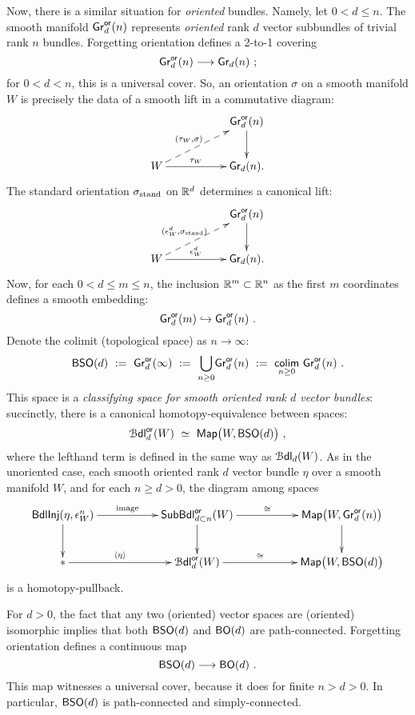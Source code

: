 Now, there is a similar situation for \emph{oriented} bundles.
Namely, let $0<d\leq n$.
The smooth manifold 
$
{\sf Gr}^{\sf or}_d(n)
$
represents \emph{oriented} rank $d$ vector subbundles of trivial rank $n$ bundles. 
Forgetting orientation defines a 2-to-1 covering 
\[
{\sf Gr}^{\sf or}_d(n)
\longrightarrow
{\sf Gr}_d(n)
~;
\]
for $0<d<n$, this is a universal cover.
So, an orientation $\sigma$ on a smooth manifold $W$ is precisely the data of a smooth lift in a commutative diagram:
\[
\xymatrix{
&&
{\sf Gr}^{\sf or}_d(n)
\ar[d]
\\
W
\ar[rr]^-{\tau_W}
\ar@{-->}[urr]^-{(\tau_W , \sigma)}
&&
{\sf Gr}_d(n)
.
}
\]
The standard orientation $\sigma_{\rm stand}$ on $\mathbb R^d$ determines a canonical lift:
\[
\xymatrix{
&&
{\sf Gr}^{\sf or}_d(n)
\ar[d]
\\
W
\ar[rr]^-{\epsilon^d_W}
\ar@{-->}[urr]^-{(\epsilon^d_W , \sigma_{\rm stand})}
&&
{\sf Gr}_d(n)
.
}
\]
Now, for each $0< d\leq m \leq n$, the inclusion $\mathbb R^m \subset \mathbb R^n$ as the first $m$ coordinates defines a smooth embedding:
\[
{\sf Gr}^{\sf or}_d(m)
\hookrightarrow
{\sf Gr}^{\sf or}_d(n)
~.
\]
Denote the colimit (topological space) as $n\to \infty$:
\[
{\sf BSO}(d)
~:=~
{\sf Gr}^{\sf or}_d(\infty)
~:=~
\underset{n\geq 0}
\bigcup
{\sf Gr}^{\sf or}_d(n)
~:=~
\underset{n \geq 0}
{\operatorname{{\sf colim}}}
~{\sf Gr}^{\sf or}_d(n)
~.
\]
This space is a \emph{classifying space for smooth oriented rank $d$ vector bundles}:
succinctly, 
there is a canonical homotopy-equivalence between spaces:
\begin{equation}
\label{e17m}
\mathcal B{\sf dl}^{\sf or}_d(W)
~\simeq~
\operatorname{{\sf Map}}\bigl(
W , {\sf BSO}(d)
\bigr)
~,
\end{equation}
where the lefthand term is defined in the same way as $\mathcal B{\sf dl}_d(W)$.
As in the unoriented case, each smooth oriented rank $d$ vector bundle $\eta$ over a smooth manifold $W$, and for each $n \geq d>0$, the diagram among spaces
\begin{equation}
\label{e18m}
\xymatrix{
{\sf BdlInj}(\eta , \epsilon^n_W)
\ar[d]
\ar[rr]^-{\rm image}
&&
{\sf SubBdl}^{\sf or}_{d \subset n}(W)
\ar[rr]^-{\cong}
\ar[d]
&&
\Map\bigl(
W
,
{\sf Gr}^{\sf or}_d(n)
\bigr)
\ar[d]
\\
\ast
\ar[rr]^-{\lag \eta\rag}
&&
\cB{\sf dl}^{\sf or}_d(W)
\ar[rr]^-{\cong}
&&
\Map\bigl(
W , {\sf BSO}(d)
\bigr)
}
\end{equation}
is a homotopy-pullback.


For $d>0$, the fact that any two (oriented) vector spaces are (oriented) isomorphic implies that both ${\sf BSO}(d)$ and ${\sf BO}(d)$ are path-connected.
Forgetting orientation defines a continuous map
\[
{\sf BSO}(d)
\longrightarrow
{\sf BO}(d)
~.
\]
This map witnesses a universal cover, because it does for finite $n>d>0$.
In particular, ${\sf BSO}(d)$ is path-connected and simply-connected. 




